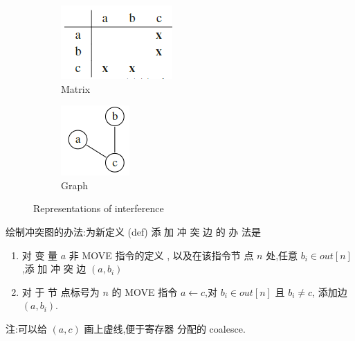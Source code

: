 \begin{figure}[!htb]
    \centering
    \begin{subfigure}{0.12\textwidth}
        \centering
        \includegraphics[width=\textwidth]{pic/CP10/Matrix.png}
        \caption{Matrix}
    \end{subfigure}
    \begin{subfigure}{0.08\textwidth}
        \centering
        \includegraphics[width=\textwidth]{pic/CP10/Graph.png}
        \caption{Graph}
    \end{subfigure}
    \caption{Representations of interference}
\end{figure}

绘制冲突图的办法:为新定义 (def) 添 加 冲 突 边 的 办 法是
\begin{enumerate}
    \item 对 变 量 $a$ 非 MOVE 指令的定义 , 以及在该指令节 点 $n$ 处,任意 $b_i\in out[n]$,添 加 冲 突 边 $(a,b_i)$
    \item 对 于 节 点标号为 $n$ 的 MOVE 指令 $a\leftarrow c$,对 $b_i\in out[n]$ 且 $b_i\ne c$, 添加边 $(a,b_i)$. 
\end{enumerate}
注:可以给 $(a,c)$ 画上虚线,便于寄存器 分配的 coalesce.



